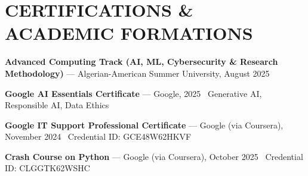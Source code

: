\documentclass[10.5pt, letterpaper]{article}
\begin{document}
\section{CERTIFICATIONS \& ACADEMIC FORMATIONS}
\noindent\textbf{Advanced Computing Track (AI, ML, Cybersecurity \& Research Methodology)} --- Algerian-American Summer University, August 2025\par
\noindent\textbf{Google AI Essentials Certificate} --- Google, 2025 \textbar\ Generative AI, Responsible AI, Data Ethics\par
\noindent\textbf{Google IT Support Professional Certificate} --- Google (via Coursera), November 2024 \textbar\ Credential ID: GCE48W62HKVF\par
\noindent\textbf{Crash Course on Python} --- Google (via Coursera), October 2025 \textbar\ Credential ID: CLGGTK62WSHC\par
\end{document}
